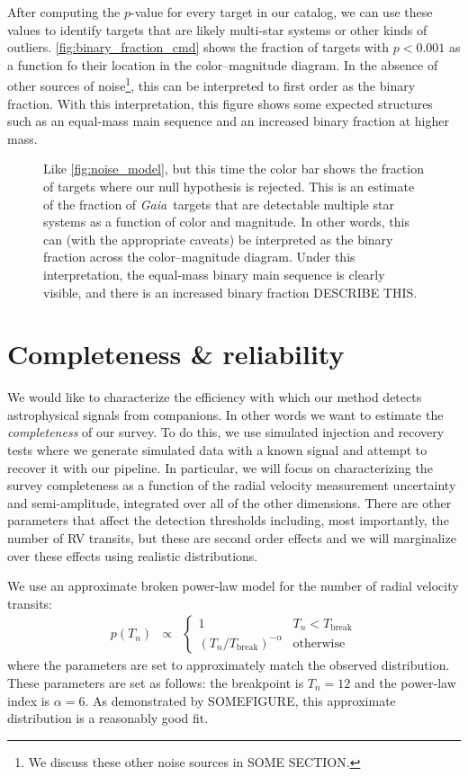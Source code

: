 \documentclass[modern, letterpaper]{aastex63}
\newcommand{\project}[1]{\textsl{#1}}
\newcommand{\Gaia}{\project{Gaia}}
\begin{document}
After computing the $p$-value for every target in our catalog, we can use these values to identify targets that are likely multi-star systems or other kinds of outliers.
\autoref{fig:binary_fraction_cmd} shows the fraction of targets with $p < 0.001$ as a function fo their location in the color--magnitude diagram.
In the absence of other sources of noise\footnote{We discuss these other noise sources in SOME SECTION.}, this can be interpreted to first order as the binary fraction.
With this interpretation, this figure shows some expected structures such as an equal-mass main sequence and an increased binary fraction at higher mass.

\begin{figure}
	\caption{Like \autoref{fig:noise_model}, but this time the color bar shows the fraction of targets where our null hypothesis is rejected.
		This is an estimate of the fraction of \Gaia\ targets that are detectable multiple star systems as a function of color and magnitude.
		In other words, this can (with the appropriate caveats) be interpreted as the binary fraction across the color--magnitude diagram.
		Under this interpretation, the equal-mass binary main sequence is clearly visible, and there is an increased binary fraction DESCRIBE THIS.
		\label{fig:binary_fraction_cmd}}
\end{figure}

\section{Completeness \& reliability}

We would like to characterize the efficiency with which our method detects astrophysical signals from companions.
In other words we want to estimate the \emph{completeness} of our survey.
To do this, we use simulated injection and recovery tests where we generate simulated data with a known signal and attempt to recover it with our pipeline.
In particular, we will focus on characterizing the survey completeness as a function of the radial velocity measurement uncertainty and semi-amplitude, integrated over all of the other dimensions.
There are other parameters that affect the detection thresholds including, most importantly, the number of RV transits, but these are second order effects and we will marginalize over these effects using realistic distributions.

We use an approximate broken power-law model for the number of radial velocity transits:
\begin{eqnarray}
	\label{eq:nb-transits}
	p(T_n) &\propto& \left\{\begin{array}{ll}
	1                                  & T_n < T_\mathrm{break} \\
	(T_n / T_\mathrm{break})^{-\alpha} & \mathrm{otherwise}
	\end{array} \right.
\end{eqnarray}
where the parameters are set to approximately match the observed distribution.
These parameters are set as follows: the breakpoint is $T_n = 12$ and the power-law index is $\alpha = 6$.
As demonstrated by SOMEFIGURE, this approximate distribution is a reasonably good fit.
\end{document}
